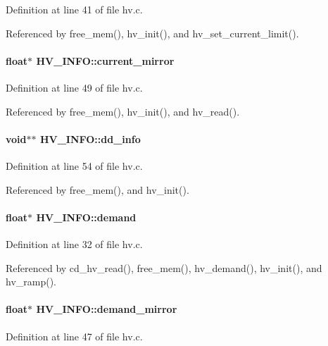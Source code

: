 Definition at line 41 of file hv.c.

Referenced by free\_\-mem(), hv\_\-init(), and hv\_\-set\_\-current\_\-limit().
\paragraph[{current\_\-mirror}]{\setlength{\rightskip}{0pt plus 5cm}float$\ast$ {\bf HV\_\-INFO::current\_\-mirror}}\hfill\label{structHV__INFO_a62b97138272e788fa8705300a07b469e}


Definition at line 49 of file hv.c.

Referenced by free\_\-mem(), hv\_\-init(), and hv\_\-read().
\paragraph[{dd\_\-info}]{\setlength{\rightskip}{0pt plus 5cm}void$\ast$$\ast$ {\bf HV\_\-INFO::dd\_\-info}}\hfill\label{structHV__INFO_a493551928e54f1d2389d3623e7f1eb13}


Definition at line 54 of file hv.c.

Referenced by free\_\-mem(), and hv\_\-init().
\paragraph[{demand}]{\setlength{\rightskip}{0pt plus 5cm}float$\ast$ {\bf HV\_\-INFO::demand}}\hfill\label{structHV__INFO_ac2f4df0be0ef80b9448fa003cf3c00a5}


Definition at line 32 of file hv.c.

Referenced by cd\_\-hv\_\-read(), free\_\-mem(), hv\_\-demand(), hv\_\-init(), and hv\_\-ramp().
\paragraph[{demand\_\-mirror}]{\setlength{\rightskip}{0pt plus 5cm}float$\ast$ {\bf HV\_\-INFO::demand\_\-mirror}}\hfill\label{structHV__INFO_ac49b673d5b0ad29adeb87f6bd97946c0}


Definition at line 47 of file hv.c.

